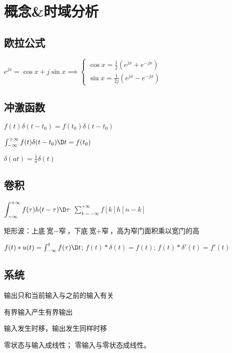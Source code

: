 \section{概念\&时域分析}

\subsection{欧拉公式}
\(e^{jx} = \cos x + j \sin x\implies
\begin{cases}
  \cos{x} = \frac{1}{2}(e^{jx}+e^{-jx}) \\
  \sin{x} = \frac{1}{2j}(e^{jx}-e^{-jx})
\end{cases}\)

\subsection{冲激函数}
\begin{description}
  \tightlist
  \item[加权] \(f(t)\delta(t-t_0) = f(t_0)\delta(t-t_0)\)
  \item[抽样] \(\int_{-\infty}^{+\infty} f(t)\delta(t-t_0)\D t = f(t_0)\)
  \item[尺度] \(\delta(at) = \frac{1}{a}\delta(t)\)
\end{description}

\subsection{卷积}
\begin{center}
	\(\displaystyle \int_{-\infty}^{+\infty}f(\tau)h(t-\tau)\D\tau\)
\(\displaystyle \sum_{k=-\infty}^{+\infty} f[k] h[n-k]\)
\end{center}
\vspace{-10pt}
矩形波：上底\(\text{宽}-\text{窄}\)，下底\(\text{宽}+\text{窄}\)，高为窄门面积乘以宽门的高

\(f(t)*u(t) = \int_{-\infty}^tf(\tau)\D t\);
\(f(t)*\delta(t) = f(t)\);
\(f(t)*\delta'(t) = f'(t)\)

\subsection{系统}
\begin{description}
\tightlist
\item[因果] 输出只和当前输入与之前的输入有关

\item[稳定] 有界输入产生有界输出

\item[时不变] 输入发生时移，输出发生同样时移

\item[增量线性]
零状态与输入成线性；
零输入与零状态成线性。
\end{description}
\vspace{-7pt}